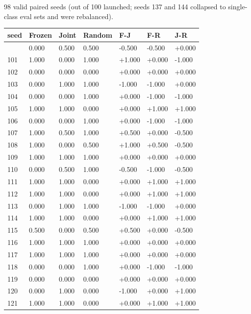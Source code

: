 \documentclass[11pt]{article}
\begin{document}
98 valid paired seeds (out of 100 launched; seeds 137 and 144 collapsed
to single-class eval sets and were rebalanced).

{\def\LTcaptype{none} %
\begin{longtable}[]{@{}lllllll@{}}
\toprule\noalign{}
seed & Frozen & Joint & Random & F-J & F-R & J-R \\
\midrule\noalign{}
\endhead
\bottomrule\noalign{}
\endlastfoot
100 & 0.000 & 0.500 & 0.500 & -0.500 & -0.500 & +0.000 \\
101 & 1.000 & 0.000 & 1.000 & +1.000 & +0.000 & -1.000 \\
102 & 0.000 & 0.000 & 0.000 & +0.000 & +0.000 & +0.000 \\
103 & 0.000 & 1.000 & 1.000 & -1.000 & -1.000 & +0.000 \\
104 & 0.000 & 0.000 & 1.000 & +0.000 & -1.000 & -1.000 \\
105 & 1.000 & 1.000 & 0.000 & +0.000 & +1.000 & +1.000 \\
106 & 0.000 & 0.000 & 1.000 & +0.000 & -1.000 & -1.000 \\
107 & 1.000 & 0.500 & 1.000 & +0.500 & +0.000 & -0.500 \\
108 & 1.000 & 0.000 & 0.500 & +1.000 & +0.500 & -0.500 \\
109 & 1.000 & 1.000 & 1.000 & +0.000 & +0.000 & +0.000 \\
110 & 0.000 & 0.500 & 1.000 & -0.500 & -1.000 & -0.500 \\
111 & 1.000 & 1.000 & 0.000 & +0.000 & +1.000 & +1.000 \\
112 & 1.000 & 1.000 & 0.000 & +0.000 & +1.000 & +1.000 \\
113 & 0.000 & 1.000 & 1.000 & -1.000 & -1.000 & +0.000 \\
114 & 1.000 & 1.000 & 0.000 & +0.000 & +1.000 & +1.000 \\
115 & 0.500 & 0.000 & 0.500 & +0.500 & +0.000 & -0.500 \\
116 & 1.000 & 1.000 & 1.000 & +0.000 & +0.000 & +0.000 \\
117 & 1.000 & 1.000 & 1.000 & +0.000 & +0.000 & +0.000 \\
118 & 0.000 & 0.000 & 1.000 & +0.000 & -1.000 & -1.000 \\
119 & 0.000 & 0.000 & 0.000 & +0.000 & +0.000 & +0.000 \\
120 & 0.000 & 1.000 & 0.000 & -1.000 & +0.000 & +1.000 \\
121 & 1.000 & 1.000 & 0.000 & +0.000 & +1.000 & +1.000 \\

\end{longtable}}
\end{document}
